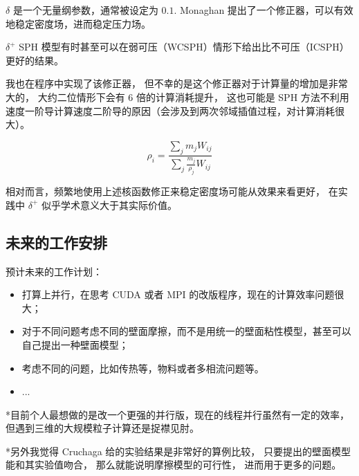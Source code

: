 \begin{frame}
    $\delta$ 是一个无量纲参数，通常被设定为 $0.1$.
Monaghan 提出了一个修正器，可以有效地稳定密度场，进而稳定压力场。

$\delta^+$ SPH 模型有时甚至可以在弱可压（WCSPH）情形下给出比不可压（ICSPH）更好的结果。


我也在程序中实现了该修正器，
但不幸的是这个修正器对于计算量的增加是非常大的，
大约二位情形下会有 $6$ 倍的计算消耗提升，
这也可能是 SPH 方法不利用速度一阶导计算速度二阶导的原因（会涉及到两次邻域插值过程，对计算消耗很大）。

\begin{equation}
    \rho_i = \frac{\sum_j m_j W_{ij}}{\sum_j \frac{m_j}{\rho_j}W_{ij}}
\end{equation}

相对而言，频繁地使用上述核函数修正来稳定密度场可能从效果来看更好，
在实践中
$\delta^+$ 似乎学术意义大于其实际价值。
\end{frame}

\subsection{未来的工作安排}

\begin{frame}
    预计未来的工作计划：
    \begin{itemize}
        \item 打算上并行，在思考 CUDA 或者 MPI 的改版程序，现在的计算效率问题很大；
        \item 对于不同问题考虑不同的壁面摩擦，而不是用统一的壁面粘性模型，甚至可以自己提出一种壁面模型；
        \item 考虑不同的问题，比如传热等，物料或者多相流问题等。
        \item ...
    \end{itemize}
    *目前个人最想做的是改一个更强的并行版，现在的线程并行虽然有一定的效率，
    但遇到三维的大规模粒子计算还是捉襟见肘。
    
    *另外我觉得 Cruchaga 给的实验结果是非常好的算例比较，
    只要提出的壁面模型能和其实验值吻合，
    那么就能说明摩擦模型的可行性，
    进而用于更多的问题。
\end{frame}